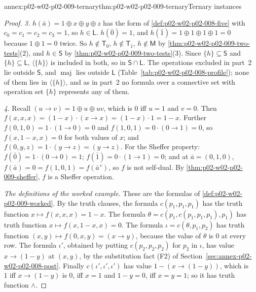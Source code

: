 \begin{annexitem}{annex:p02-w02-p02-009-ternary}{thm:p02-w02-p02-009-ternary}{Ternary instances}
\begin{proof}
\emph{3.}  \(h(\bar a)=1\oplus x\oplus y\oplus z\) has the form of
\cref{def:p02-w02-p02-008-five} with \(c_0=c_1=c_2=c_3=1\), so
\(h\in\mathsf L\).  \(h(\bar0)=1\), and \(h(\bar1)=1\oplus1\oplus1\oplus1=0\)
because \(1\oplus1=0\) twice.  So \(h\notin\mathsf T_0\),
\(h\notin\mathsf T_1\), \(h\notin\mathsf M\) by
\cref{thm:p02-w02-p02-009-two-tests}(2), and \(h\in\mathsf S\) by
\cref{thm:p02-w02-p02-009-two-tests}(3).  Since \(\{h\}\subseteq\mathsf S\)
and \(\{h\}\subseteq\mathsf L\), \(\langle\{h\}\rangle\) is included in both,
so in \(\mathsf S\cap\mathsf L\).  The operations excluded in part~2 lie
outside \(\mathsf S\), and \(\operatorname{maj}\) lies outside \(\mathsf L\)
(Table~\ref{tab:p02-w02-p02-008-profile}); none of them lies in
\(\langle\{h\}\rangle\), and as in part~2 no formula over a connective set
with operation set \(\{h\}\) represents any of them.

\emph{4.}  Recall \((u\to v)=1\oplus u\oplus uv\), which is \(0\) iff
\(u=1\) and \(v=0\).  Then \(f(x,x,x)=(1-x)\cdot(x\to x)=(1-x)\cdot1=1-x\).
Further \(f(0,1,0)=1\cdot(1\to0)=0\) and \(f(1,0,1)=0\cdot(0\to1)=0\), so
\(f(x,1-x,x)=0\) for both values of \(x\); and
\(f(0,y,z)=1\cdot(y\to z)=(y\to z)\).  For the Sheffer property:
\(f(\bar0)=1\cdot(0\to0)=1\); \(f(\bar1)=0\cdot(1\to1)=0\); and at
\(\bar a=(0,1,0)\), \(f(\bar a)=0=f(1,0,1)=f(\bar a^{\,c})\), so \(f\) is
not self-dual.  By \cref{thm:p02-w02-p02-009-sheffer}, \(f\) is a Sheffer
operation.

\emph{The definitions of the worked example.}  These are the formulas of
\cref{def:p02-w02-p02-009-worked}.  By the truth clauses, the formula
\(c(p_1,p_1,p_1)\) has the truth function \(x\mapsto f(x,x,x)=1-x\).  The
formula
\(\theta=c(p_1,c(p_1,p_1,p_1),p_1)\) has truth function
\(x\mapsto f(x,1-x,x)=0\).  The formula \(\iota=c(\theta,p_1,p_2)\) has
truth function \((x,y)\mapsto f(0,x,y)=(x\to y)\), because the value of
\(\theta\) is \(0\) at every row.  The formula \(\iota'\), obtained by
putting \(c(p_2,p_2,p_2)\) for \(p_2\) in \(\iota\), has value
\(x\to(1-y)\) at \((x,y)\), by the substitution fact (F2) of
Section~\ref{sec:annex-p02-w02-p02-008-post}.  Finally
\(c(\iota',\iota',\iota')\) has value \(1-(x\to(1-y))\), which is \(1\) iff
\(x\to(1-y)\) is \(0\), iff \(x=1\) and \(1-y=0\), iff \(x=y=1\); so it has
truth function \(\land\).
\end{proof}
\end{annexitem}
